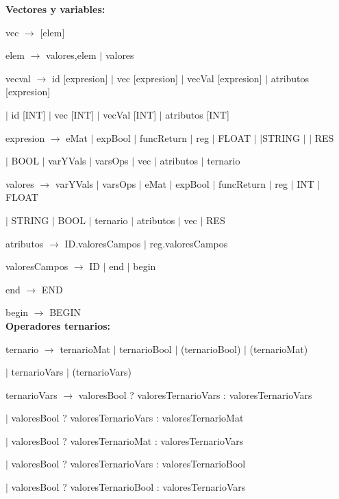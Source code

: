 \textbf{Vectores y variables:}

vec $\rightarrow$ [elem]

elem $\rightarrow$ valores,elem $|$ valores

vecval $\rightarrow$ id [expresion] $|$ vec [expresion] $|$ vecVal [expresion] $|$ atributos [expresion]

\hspace{15mm}$|$ id [INT] $|$ vec [INT] $|$ vecVal [INT] $|$ atributos [INT]

expresion $\rightarrow$ eMat
$|$  expBool
$|$  funcReturn
$|$  reg
$|$  FLOAT $|$
$|$STRING $|$
$|$  RES

\hspace{15mm}$|$   BOOL $|$  varYVals $|$  varsOps $|$  vec $|$  atributos $|$  ternario 
 
valores $\rightarrow$  varYVals
$|$  varsOps
$|$  eMat
$|$  expBool
$|$  funcReturn
$|$  reg
$|$  INT
$|$  FLOAT
  
  \hspace{15mm}$|$  STRING
  $|$  BOOL
  $|$  ternario
  $|$  atributos
  $|$  vec
  $|$  RES
 
atributos $\rightarrow$ ID.valoresCampos $|$ reg.valoresCampos

valoresCampos $\rightarrow$ ID $|$ end $|$ begin

end $\rightarrow$ END

begin $\rightarrow$ BEGIN\\

\textbf{Operadores ternarios:}

ternario $\rightarrow$ ternarioMat $|$ ternarioBool $|$ (ternarioBool) $|$ (ternarioMat) 

\hspace{15mm}$|$ ternarioVars  $|$ (ternarioVars)

ternarioVars $\rightarrow$ valoresBool ? valoresTernarioVars : valoresTernarioVars  

  \hspace{15mm}$|$  valoresBool ? valoresTernarioVars : valoresTernarioMat 
  
  \hspace{15mm}$|$  valoresBool ? valoresTernarioMat : valoresTernarioVars
  
  \hspace{15mm}$|$  valoresBool ? valoresTernarioVars : valoresTernarioBool 
  
  \hspace{15mm}$|$  valoresBool ? valoresTernarioBool : valoresTernarioVars
  
